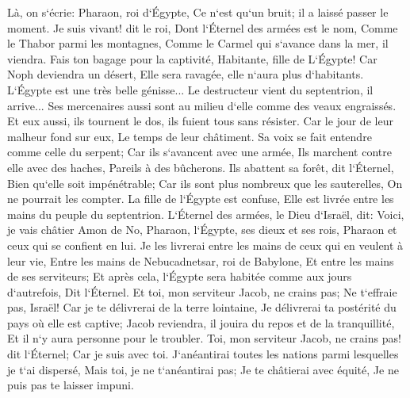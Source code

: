 \verse Là, on s`écrie: Pharaon, roi d`Égypte, Ce n`est qu`un bruit; il a laissé passer le moment. 
\verse Je suis vivant! dit le roi, Dont l`Éternel des armées est le nom, Comme le Thabor parmi les montagnes, Comme le Carmel qui s`avance dans la mer, il viendra. 
\verse Fais ton bagage pour la captivité, Habitante, fille de L`Égypte! Car Noph deviendra un désert, Elle sera ravagée, elle n`aura plus d`habitants. 
\verse L`Égypte est une très belle génisse... Le destructeur vient du septentrion, il arrive... 
\verse Ses mercenaires aussi sont au milieu d`elle comme des veaux engraissés. Et eux aussi, ils tournent le dos, ils fuient tous sans résister. Car le jour de leur malheur fond sur eux, Le temps de leur châtiment. 
\verse Sa voix se fait entendre comme celle du serpent; Car ils s`avancent avec une armée, Ils marchent contre elle avec des haches, Pareils à des bûcherons. 
\verse Ils abattent sa forêt, dit l`Éternel, Bien qu`elle soit impénétrable; Car ils sont plus nombreux que les sauterelles, On ne pourrait les compter. 
\verse La fille de l`Égypte est confuse, Elle est livrée entre les mains du peuple du septentrion. 
\verse L`Éternel des armées, le Dieu d`Israël, dit: Voici, je vais châtier Amon de No, Pharaon, l`Égypte, ses dieux et ses rois, Pharaon et ceux qui se confient en lui. 
\verse Je les livrerai entre les mains de ceux qui en veulent à leur vie, Entre les mains de Nebucadnetsar, roi de Babylone, Et entre les mains de ses serviteurs; Et après cela, l`Égypte sera habitée comme aux jours d`autrefois, Dit l`Éternel. 
\verse Et toi, mon serviteur Jacob, ne crains pas; Ne t`effraie pas, Israël! Car je te délivrerai de la terre lointaine, Je délivrerai ta postérité du pays où elle est captive; Jacob reviendra, il jouira du repos et de la tranquillité, Et il n`y aura personne pour le troubler. 
\verse Toi, mon serviteur Jacob, ne crains pas! dit l`Éternel; Car je suis avec toi. J`anéantirai toutes les nations parmi lesquelles je t`ai dispersé, Mais toi, je ne t`anéantirai pas; Je te châtierai avec équité, Je ne puis pas te laisser impuni. 

